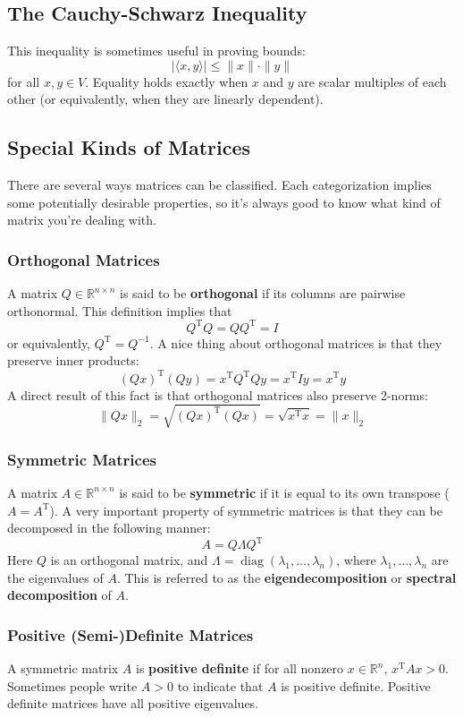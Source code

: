 \documentclass{article}
\DeclareMathOperator*{\diag}{diag}
\newcommand{\R}{\mathbb{R}}
\newcommand{\tran}{^\text{T}}
\newcommand{\inner}[2]{\langle #1, #2 \rangle}
\newcommand{\term}[1]{\textbf{#1}}
\begin{document}
\subsection{The Cauchy-Schwarz Inequality}
This inequality is sometimes useful in proving bounds:
\[|\inner{x}{y}| \leq \|x\| \cdot \|y\|\]
for all $x, y \in V$. Equality holds exactly when $x$ and $y$ are scalar multiples of each other (or equivalently, when they are linearly dependent).

\subsection{Special Kinds of Matrices}
There are several ways matrices can be classified. Each categorization implies some potentially desirable properties, so it's always good to know what kind of matrix you're dealing with.

\subsubsection{Orthogonal Matrices}
A matrix $Q \in \R^{n \times n}$ is said to be \term{orthogonal} if its columns are pairwise orthonormal. This definition implies that
\[Q\tran Q = QQ\tran = I\]
or equivalently, $Q\tran = Q^{-1}$. A nice thing about orthogonal matrices is that they preserve inner products:
\[(Qx)\tran(Qy) = x\tran Q\tran Qy = x\tran I y = x\tran y\]
A direct result of this fact is that orthogonal matrices also preserve 2-norms:
\[\|Qx\|_2 = \sqrt{(Qx)\tran(Qx)} = \sqrt{x\tran x} = \|x\|_2\]

\subsubsection{Symmetric Matrices}
A matrix $A \in \R^{n \times n}$ is said to be \term{symmetric} if it is equal to its own transpose ($A = A\tran$). A very important property of symmetric matrices is that they can be decomposed in the following manner:
\[A = Q\Lambda Q\tran\]
Here $Q$ is an orthogonal matrix, and $\Lambda = \diag(\lambda_1, \dots, \lambda_n)$, where $\lambda_1, \dots, \lambda_n$ are the eigenvalues of $A$. This is referred to as the \term{eigendecomposition} or \term{spectral decomposition} of $A$.

\subsubsection{Positive (Semi-)Definite Matrices}
A symmetric matrix $A$ is \term{positive definite} if for all nonzero $x \in \R^n$, $x\tran Ax > 0$. Sometimes people write $A > 0$ to indicate that $A$ is positive definite. Positive definite matrices have all positive eigenvalues.
\end{document}
